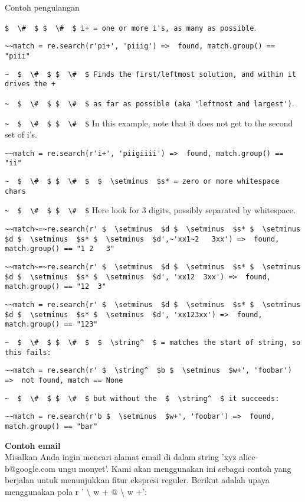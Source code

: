 \begin {enumerate}
\begin {enumerate}
Contoh pengulangan

 \verb|$  \#  $ $  \#  $ i+ = one or more i's, as many as possible|.

\verb|~~match = re.search(r'pi+', 'piiig') =>  found, match.group() == "piii"|

\verb|~  $  \#  $ $  \#  $ Finds the first/leftmost solution, and within it drives the +|

\verb|~  $  \#  $ $  \#  $ as far as possible (aka 'leftmost and largest')|.

\verb|~  $  \#  $ $  \#  $| In this example, note that it does not get to the second set of i's.

\verb|~~match = re.search(r'i+', 'piigiiii') =>  found, match.group() == "ii"|

\verb|~  $  \#  $ $  \#  $  $  \setminus  $s* = zero or more whitespace chars|

\verb|~  $  \#  $ $  \#  $| Here look for 3 digits, possibly separated by whitespace.

\verb|~~match~=~re.search(r' $  \setminus  $d $  \setminus  $s* $  \setminus  $d $  \setminus  $s* $  \setminus  $d',~'xx1~2   3xx') =>  found, match.group() == "1 2   3"|

\verb|~~match~=~re.search(r' $  \setminus  $d $  \setminus  $s* $  \setminus  $d $  \setminus  $s* $  \setminus  $d', 'xx12  3xx') =>  found, match.group() == "12  3"|

\verb|~~match = re.search(r' $  \setminus  $d $  \setminus  $s* $  \setminus  $d $  \setminus  $s* $  \setminus  $d', 'xx123xx') =>  found, match.group() == "123"|

\verb|~  $  \#  $ $  \#  $  $  \string^  $ = matches the start of string, so this fails:|

\verb|~~match = re.search(r' $  \string^  $b $  \setminus  $w+', 'foobar') =>  not found, match == None|

\verb|~  $  \#  $ $  \#  $ but without the  $  \string^  $ it succeeds:|

\verb|~~match = re.search(r'b $  \setminus  $w+', 'foobar') =>  found, match.group() == "bar"|

{\fontsize{14pt}{14pt}\selectfont \textbf{Contoh email} \\}
Misalkan Anda ingin mencari alamat email di dalam string 'xyz alice-b@google.com ungu monyet'. Kami akan menggunakan ini sebagai contoh yang berjalan untuk menunjukkan fitur ekspresi reguler. Berikut adalah upaya menggunakan pola r ' $  \setminus  $ w + @  $  \setminus  $ w +':


\end{enumerate}
\end{enumerate}
